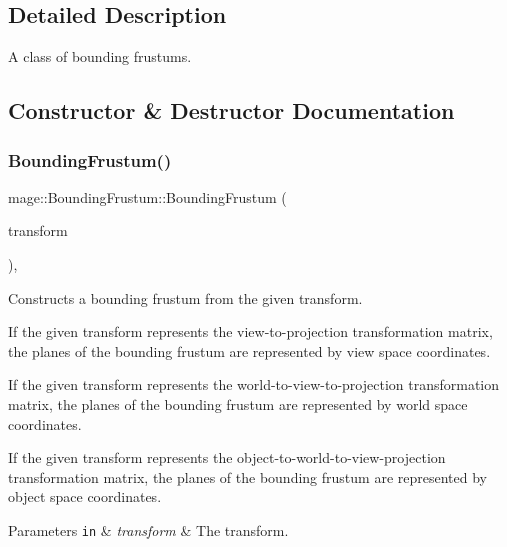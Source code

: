 \subsection{Detailed Description}
A class of bounding frustums. 

\subsection{Constructor \& Destructor Documentation}
\mbox{\label{classmage_1_1_bounding_frustum_afafc5433abc80e872242b5488ca0c835}} 
\subsubsection{\texorpdfstring{Bounding\+Frustum()}{BoundingFrustum()}\hspace{0.1cm}{\footnotesize\ttfamily [1/3]}}
{\footnotesize\ttfamily mage\+::\+Bounding\+Frustum\+::\+Bounding\+Frustum (\begin{DoxyParamCaption}\item[{C\+X\+M\+M\+A\+T\+R\+IX}]{transform }\end{DoxyParamCaption})\hspace{0.3cm}{\ttfamily [explicit]}, {\ttfamily [noexcept]}}

Constructs a bounding frustum from the given transform.

If the given transform represents the view-\/to-\/projection transformation matrix, the planes of the bounding frustum are represented by view space coordinates.

If the given transform represents the world-\/to-\/view-\/to-\/projection transformation matrix, the planes of the bounding frustum are represented by world space coordinates.

If the given transform represents the object-\/to-\/world-\/to-\/view-\/projection transformation matrix, the planes of the bounding frustum are represented by object space coordinates.


\begin{DoxyParams}[1]{Parameters}
\mbox{\tt in}  & {\em transform} & The transform. \\
\hline
\end{DoxyParams}
\mbox{\label{classmage_1_1_bounding_frustum_a22233ec36a176312dd453bbab682c313}} 
